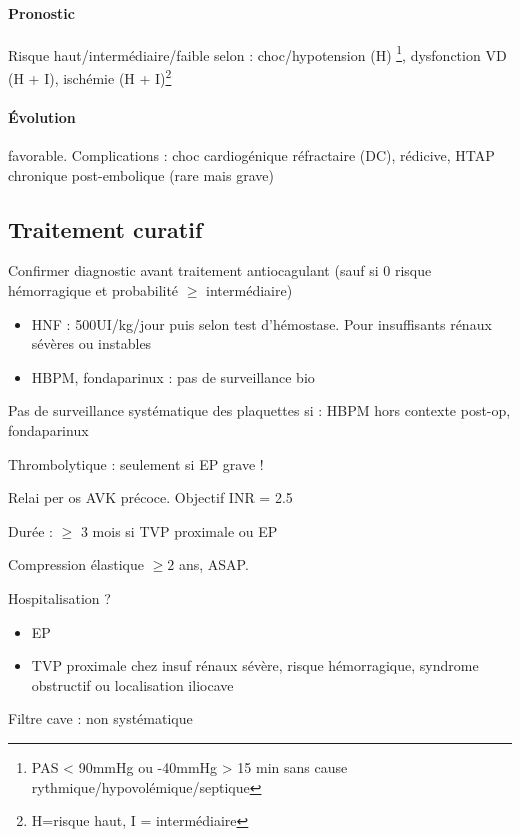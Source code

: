 \paragraph{Pronostic}
Risque haut/intermédiaire/faible selon : choc/hypotension (H) \footnote{PAS < 90mmHg
ou -40mmHg > 15 min sans cause rythmique/hypovolémique/septique}, dysfonction
VD (H + I), ischémie (H + I)\footnote{H=risque haut, I = intermédiaire}

\paragraph{Évolution} favorable. Complications : choc cardiogénique réfractaire
(DC), rédicive, HTAP chronique post-embolique (rare mais grave)

\subsection{Traitement curatif}
Confirmer diagnostic avant traitement antiocagulant (sauf si 0 risque
hémorragique et probabilité $\ge$ intermédiaire)

\begin{itemize}
  \item HNF : 500UI/kg/jour puis selon test d'hémostase. Pour insuffisants
    rénaux sévères ou instables
  \item HBPM, fondaparinux : pas de surveillance bio
\end{itemize}
Pas de surveillance systématique des plaquettes si : HBPM hors contexte post-op,
fondaparinux 

Thrombolytique : seulement si EP grave !

Relai per os AVK précoce. Objectif INR = 2.5

Durée : $\ge$ 3 mois si TVP proximale ou EP

Compression élastique $\ge 2$ ans, ASAP. 

Hospitalisation ? 
\begin{itemize}
  \item EP
  \item TVP proximale chez insuf rénaux sévère, risque hémorragique, syndrome
    obstructif ou localisation iliocave
\end{itemize}

Filtre cave : non systématique

